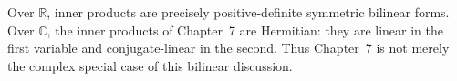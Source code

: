 Over \(\mathbb R\), inner products are precisely positive-definite symmetric
bilinear forms. Over \(\mathbb C\), the inner products of Chapter~7 are
Hermitian: they are linear in the first variable and conjugate-linear in the
second. Thus Chapter~7 is not merely the complex special case of this
bilinear discussion.
